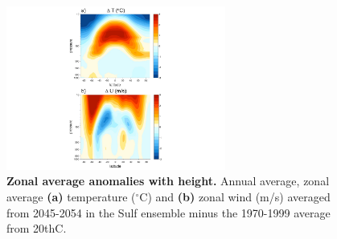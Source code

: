 \documentclass{nature}
\begin{document}
\begin{figure}%
\noindent\includegraphics[width=17pc]{figures/verticalU_T_v20thC2.pdf}  %
\caption{\textbf{Zonal average anomalies with height.} Annual average, zonal average \textbf{(a)} temperature ($^\circ$C) and \textbf{(b)} zonal wind (m/s) averaged from 2045-2054 in the Sulf ensemble minus the 1970-1999 average from 20thC.}
\label{fig:vert}
\end{figure}
\end{document}
